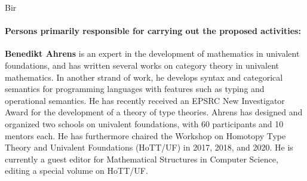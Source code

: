 \begin{sitedescription}{Bir}
\paragraph*{Persons primarily responsible for carrying out the proposed activities:}

\begin{compactitem}
 \item 
\textbf{Benedikt Ahrens} is an expert in the development of mathematics in univalent foundations, and has written several works on category theory in univalent mathematics.
In another strand of work, he develops syntax and categorical semantics for programming languages with features such as typing and operational semantics.
He has recently received an EPSRC New Investigator Award for the development of a theory of type theories.
Ahrens has designed and organized two schools on univalent foundations, with 60 participants and 10 mentors each. He has furthermore chaired the Workshop on Homotopy Type Theory and Univalent Foundations (HoTT/UF) in 2017, 2018, and 2020. He is currently a guest editor for Mathematical Structures in Computer Science, editing a special volume on HoTT/UF.
\end{compactitem}






\end{sitedescription}

